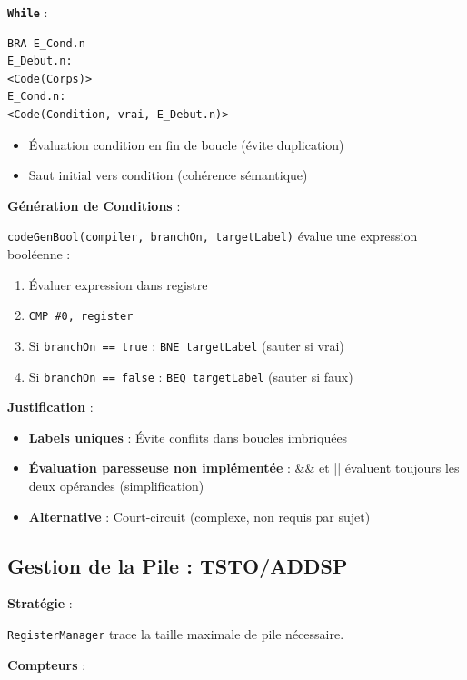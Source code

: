 \documentclass[12pt,a4paper]{article}
\begin{document}
\textbf{\texttt{While}} :

\begin{lstlisting}[style=bashstyle, numbers=none]
BRA E_Cond.n
E_Debut.n:
<Code(Corps)>
E_Cond.n:
<Code(Condition, vrai, E_Debut.n)>
\end{lstlisting}

\begin{itemize}[itemsep=0.2em]
    \item Évaluation condition en fin de boucle (évite duplication)
    \item Saut initial vers condition (cohérence sémantique)
\end{itemize}

\textbf{Génération de Conditions} :

\texttt{codeGenBool(compiler, branchOn, targetLabel)} évalue une expression booléenne :

\begin{enumerate}[itemsep=0.2em]
    \item Évaluer expression dans registre
    \item \texttt{CMP \#0, register}
    \item Si \texttt{branchOn == true} : \texttt{BNE targetLabel} (sauter si vrai)
    \item Si \texttt{branchOn == false} : \texttt{BEQ targetLabel} (sauter si faux)
\end{enumerate}

\textbf{Justification} :

\begin{itemize}[itemsep=0.2em]
    \item \textbf{Labels uniques} : Évite conflits dans boucles imbriquées
    \item \textbf{Évaluation paresseuse non implémentée} : \&\& et || évaluent toujours les deux opérandes (simplification)
    \item \textbf{Alternative} : Court-circuit (complexe, non requis par sujet)
\end{itemize}

\subsection{Gestion de la Pile : TSTO/ADDSP}

\textbf{Stratégie} :

\texttt{RegisterManager} trace la taille maximale de pile nécessaire.

\textbf{Compteurs} :
\end{document}
